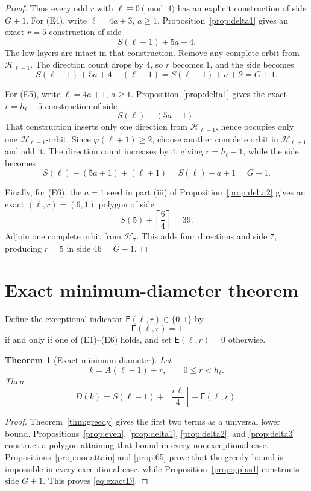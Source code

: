 \documentclass[11pt]{article}
\newtheorem{theorem}{Theorem}[section]
\theoremstyle{definition}
\newcommand{\HH}{\mathcal H}
\newcommand{\E}{\mathsf E}
\newcommand{\ph}{\varphi}
\begin{document}
\begin{proof}
Thus every odd \(r\) with \(\ell\equiv0\pmod4\) has an explicit construction of side \(G+1\).
For (E4), write \(\ell=4a+3\), \(a\ge1\).  Proposition~\ref{prop:delta1} gives an exact \(r=5\) construction of side
\[
S(\ell-1)+5a+4.
\]
The low layers are intact in that construction.  Remove any complete orbit from
\(\HH_{\ell-1}\).  The direction count drops by \(4\), so \(r\) becomes \(1\), and the side becomes
\[
S(\ell-1)+5a+4-(\ell-1)
=
S(\ell-1)+a+2
=
G+1.
\]

For (E5), write \(\ell=4a+1\), \(a\ge1\).  Proposition~\ref{prop:delta1} gives the exact \(r=h_\ell-5\) construction of side
\[
S(\ell)-(5a+1).
\]
That construction inserts only one direction from \(\HH_{\ell+1}\), hence occupies only one
\(\HH_{\ell+1}\)-orbit.  Since \(\ph(\ell+1)\ge2\), choose another complete orbit in
\(\HH_{\ell+1}\) and add it.  The direction count increases by \(4\), giving \(r=h_\ell-1\), while the side becomes
\[
S(\ell)-(5a+1)+(\ell+1)
=
S(\ell)-a+1
=
G+1.
\]

Finally, for (E6), the \(a=1\) seed in part (iii) of Proposition~\ref{prop:delta2} gives an exact \((\ell,r)=(6,1)\) polygon of side
\[
S(5)+\left\lceil\frac64\right\rceil=39.
\]
Adjoin one complete orbit from \(\HH_7\).  This adds four directions and side \(7\), producing \(r=5\) in side \(46=G+1\).
\end{proof}

\section{Exact minimum-diameter theorem}

Define the exceptional indicator \(\E(\ell,r)\in\{0,1\}\) by
\[
\E(\ell,r)=1
\]
if and only if one of \textup{(E1)}--\textup{(E6)} holds, and set
\(\E(\ell,r)=0\) otherwise.

\begin{theorem}[Exact minimum diameter]\label{thm:exactD}
Let
\[
k=A(\ell-1)+r,\qquad 0\le r<h_\ell.
\]
Then
\begin{equation}\label{eq:exactD}
\boxed{
D(k)
=
S(\ell-1)
+
\left\lceil\frac{r\ell}{4}\right\rceil
+
\E(\ell,r).
}
\end{equation}
\end{theorem}

\begin{proof}
Theorem~\ref{thm:greedy} gives the first two terms as a universal lower bound.
Propositions~\ref{prop:even}, \ref{prop:delta1}, \ref{prop:delta2}, and
\ref{prop:delta3} construct a polygon attaining that bound in every nonexceptional case.
Propositions~\ref{prop:nonattain} and \ref{prop:65} prove that the greedy bound is impossible in every exceptional case, while Proposition~\ref{prop:gplus1} constructs side \(G+1\).  This proves \eqref{eq:exactD}.
\end{proof}
\end{document}
